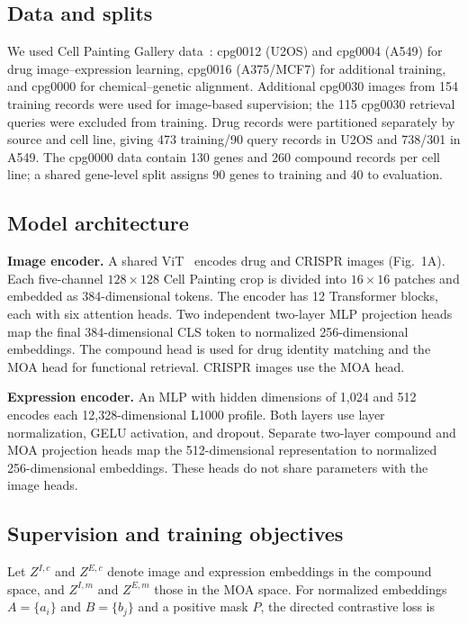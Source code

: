 \subsection{Data and splits}
We used Cell Painting Gallery data~\cite{weisbart2024}: cpg0012 (U2OS) and cpg0004 (A549) for drug image--expression learning, cpg0016 (A375/MCF7) for additional training, and cpg0000 for chemical--genetic alignment. Additional cpg0030 images from 154 training records were used for image-based supervision; the 115 cpg0030 retrieval queries were excluded from training. Drug records were partitioned separately by source and cell line, giving 473 training/90 query records in U2OS and 738/301 in A549. The cpg0000 data contain 130 genes and 260 compound records per cell line; a shared gene-level split assigns 90 genes to training and 40 to evaluation.

\subsection{Model architecture}
\noindent\textbf{Image encoder.} A shared ViT~\cite{dosovitskiy2021} encodes drug and CRISPR images (Fig.~1A). Each five-channel $128\times128$ Cell Painting crop is divided into $16\times16$ patches and embedded as 384-dimensional tokens. The encoder has 12 Transformer blocks, each with six attention heads. Two independent two-layer MLP projection heads~\cite{chen2020simclr} map the final 384-dimensional CLS token to normalized 256-dimensional embeddings. The compound head is used for drug identity matching and the MOA head for functional retrieval. CRISPR images use the MOA head.

\noindent\textbf{Expression encoder.} An MLP with hidden dimensions of 1,024 and 512 encodes each 12,328-dimensional L1000 profile. Both layers use layer normalization, GELU activation, and dropout. Separate two-layer compound and MOA projection heads map the 512-dimensional representation to normalized 256-dimensional embeddings. These heads do not share parameters with the image heads.

\subsection{Supervision and training objectives}
\begingroup
\setlength{\parskip}{5pt}
\setlength{\parindent}{0pt}
Let $Z^{I,c}$ and $Z^{E,c}$ denote image and expression embeddings in the compound space, and $Z^{I,m}$ and $Z^{E,m}$ those in the MOA space. For normalized embeddings $A=\{a_i\}$ and $B=\{b_j\}$ and a positive mask $P$, the directed contrastive loss is

